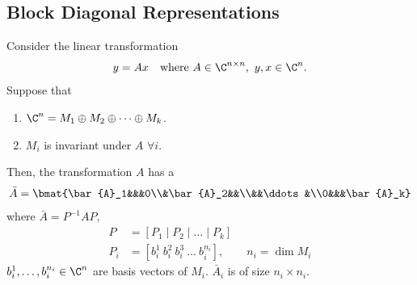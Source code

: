 \subsection{Block Diagonal Representations}\label{ss:block-diag}
\begin{theorem}
Consider the linear transformation
\[
y=Ax\quad\text{where }A\in\C^{n\times n},\ y,x\in\C^n.
\]
Suppose that
\begin{enumerate}[label=\roman*)]
\item $\C^n=M_1\oplus M_2\oplus\dots\oplus M_k$.
\item $M_i$ is invariant under $A$ $\forall i$.
\end{enumerate}
Then, the transformation $A$ has a 
\[
\bar{A}=\bmat{\bar{A}_1&&&0\\&\bar{A}_2&&\\&&\ddots&\\0&&&\bar{A}_k}
\]
%
where $\bar{A}=P^{-1}AP$,
\begin{align*}
P&=[P_1\mid P_2\mid\dots\mid P_k]\\
P_i&=[b_i^1\ b_i^2\ b_i^3\ \dots\ b_i^{n_i}],\qquad n_i=\dim M_i
\end{align*}
$b_i^1,\dots,b_i^{n_i}\in\C^n$ are basis vectors of $M_i$. $\bar{A}_i$ is of size $n_i\times n_i$.
\end{theorem}

